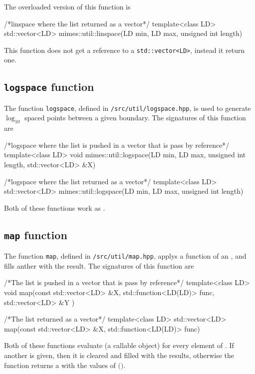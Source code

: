 \documentclass[11pt,a4paper]{article}
\begin{document}
The overloaded version of this function is 
%
\begin{cpp}
    /*linspace where the list returned as a vector*/
	template<class LD>
	std::vector<LD> mimes::util::linspace(LD min, LD max, unsigned int length)
\end{cpp}
%
This function does not get a reference to a {\tt std::vector<LD>}, instead it return one.

\subsection{{\tt logspace} function}
%
The function {\tt logspace}, defined in {\tt \mimes/src/util/logspace.hpp}, is used to generate $\log_{10}$ spaced points between a given boundary. The signatures of this function are
%
\begin{cpp}
    /*logspace where the list is pushed in a vector that is pass by reference*/
	template<class LD>
	void mimes::util::logspace(LD min, LD max, unsigned int length, std::vector<LD> &X)

    /*logspace where the list returned as a vector*/
	template<class LD>
	std::vector<LD> mimes::util::logspace(LD min, LD max, unsigned int length)
\end{cpp}
%
Both of these functions work as .

\subsection{{\tt map} function}
%
The function {\tt map}, defined in {\tt \mimes/src/util/map.hpp}, applys a function of an , and fills anther  with the result. The signatures of this function are

\begin{cpp}
    /*The list is pushed in a vector that is pass by reference*/
	template<class LD>
	void map(const std::vector<LD> &X, std::function<LD(LD)> func,  std::vector<LD> &Y )

    /*The list returned as a vector*/
	template<class LD>
	std::vector<LD> map(const std::vector<LD> &X, std::function<LD(LD)> func)
\end{cpp}
%
Both of these functions evaluate  (a callable object) for every element of . If another  is given, then it is cleared and filled with the results, otherwise the function returns a  with the values of  $($$)$.  
\end{document}

